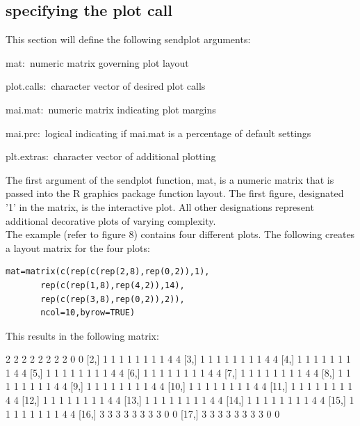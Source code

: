\documentclass[]{article}
\begin{document}
\subsection{specifying the plot call}

This section will define the following sendplot arguments:

\begin{description}
   \item{mat:~}{numeric matrix governing plot layout}
   \item{plot.calls:~}{character vector of desired plot calls}
   \item{mai.mat:~}{numeric matrix indicating plot margins}
   \item{mai.prc:~}{logical indicating if mai.mat is a percentage of default settings}
   \item{plt.extras:~}{character vector of additional plotting}
\end{description}


\indent The first argument of the sendplot function, mat, is a numeric matrix that is passed into the R graphics package function layout. The first figure, designated '1' in the matrix, is the interactive plot. All other designations represent additional decorative plots of varying complexity. \\
\indent The example (refer to figure 8) contains four different plots. The following creates a layout matrix for the four plots:

\begin{verbatim}
mat=matrix(c(rep(c(rep(2,8),rep(0,2)),1),
       rep(c(rep(1,8),rep(4,2)),14),
       rep(c(rep(3,8),rep(0,2)),2)),
       ncol=10,byrow=TRUE)
\end{verbatim}

\indent This results in the following matrix:

\begin{Schunk}
\begin{Soutput}
      [,1] [,2] [,3] [,4] [,5] [,6] [,7] [,8] [,9] [,10]
 [1,]    2    2    2    2    2    2    2    2    0     0
 [2,]    1    1    1    1    1    1    1    1    4     4
 [3,]    1    1    1    1    1    1    1    1    4     4
 [4,]    1    1    1    1    1    1    1    1    4     4
 [5,]    1    1    1    1    1    1    1    1    4     4
 [6,]    1    1    1    1    1    1    1    1    4     4
 [7,]    1    1    1    1    1    1    1    1    4     4
 [8,]    1    1    1    1    1    1    1    1    4     4
 [9,]    1    1    1    1    1    1    1    1    4     4
[10,]    1    1    1    1    1    1    1    1    4     4
[11,]    1    1    1    1    1    1    1    1    4     4
[12,]    1    1    1    1    1    1    1    1    4     4
[13,]    1    1    1    1    1    1    1    1    4     4
[14,]    1    1    1    1    1    1    1    1    4     4
[15,]    1    1    1    1    1    1    1    1    4     4
[16,]    3    3    3    3    3    3    3    3    0     0
[17,]    3    3    3    3    3    3    3    3    0     0
\end{Soutput}
\end{Schunk}
\end{document}
